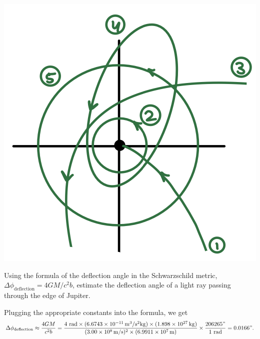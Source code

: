 \documentclass{../../templates/lkx_pset}
\begin{document}
\begin{solution}
\begin{center}
    \quad\quad\quad
    \includegraphics[scale=0.5]{orbits.png}
  \end{center}
\end{solution}

\begin{problem}{4}
Using the formula of the deflection angle in the Schwarzschild metric, $\Delta \phi_{\text{deflection}} = 4GM/c^2 b$, estimate the deflection angle of a light ray passing through the edge of Jupiter.
\end{problem}

\begin{solution}
  Plugging the appropriate constants into the formula, we get
  \[
    \Delta \phi_{\textrm{deflection}} \approx \frac{4GM}{c^2 b} = \frac{4\textrm{ rad}\times (\Gsi{6.6743e-11})\times (\kgsi{1.898e27})}{(\mpssi{3.00e8})^2\times (\msi{6.9911e7})} \times \frac{206265"}{1\textrm{ rad}} = 0.0166".
  \]
\end{solution}
\end{document}
